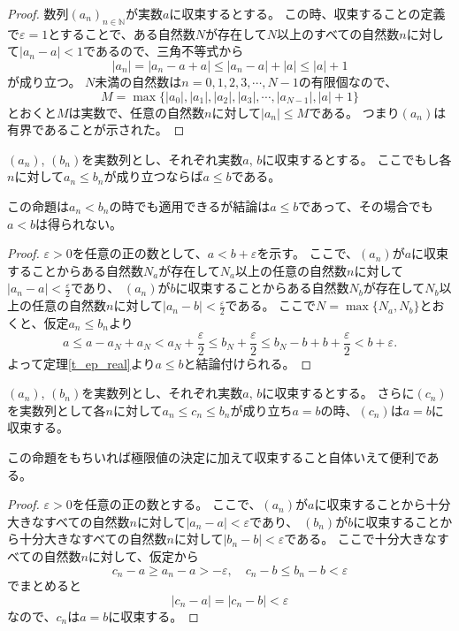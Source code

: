 \begin{proof}
数列$(a_n)_{n \in \mathbb{N}}$が実数$a$に収束するとする。
この時、収束することの定義で$\varepsilon = 1$とすることで、ある自然数$N$が存在して$N$以上のすべての自然数$n$に対して$|a_n-a| < 1$であるので、三角不等式から
$$
|a_n| = |a_n-a+a| \le |a_n-a|+|a| \le |a|+1
$$
が成り立つ。
$N$未満の自然数は$n = 0, 1, 2, 3, \cdots, N-1$の有限個なので、
$$
M = \max\{ |a_0|, |a_1|, |a_2|, |a_3|, \cdots, |a_{N-1}|, |a|+1 \}
$$
とおくと$M$は実数で、任意の自然数$n$に対して$|a_n| \le M$である。
つまり$(a_n)$は有界であることが示された。
\end{proof}

\begin{proposition}[極限と大小関係]
\label{t_limord}
$(a_n)$, $(b_n)$を実数列とし、それぞれ実数$a$, $b$に収束するとする。
ここでもし各$n$に対して$a_n \le b_n$が成り立つならば$a \le b$である。
\end{proposition}

\begin{remark}
この命題は$a_n < b_n$の時でも適用できるが結論は$a \le b$であって、その場合でも$a < b$は得られない。
\end{remark}

\begin{proof}
$\varepsilon > 0$を任意の正の数として、$a < b+\varepsilon$を示す。
ここで、$(a_n)$が$a$に収束することからある自然数$N_a$が存在して$N_a$以上の任意の自然数$n$に対して$|a_n-a| < \frac{\varepsilon}{2}$であり、
$(a_n)$が$b$に収束することからある自然数$N_b$が存在して$N_b$以上の任意の自然数$n$に対して$|a_n-b| < \frac{\varepsilon}{2}$である。
ここで$N = \max\{ N_a, N_b \}$とおくと、仮定$a_n \le b_n$より
$$
a \le a-a_N+a_N < a_N+\frac{\varepsilon}{2} \le b_N+\frac{\varepsilon}{2} \le b_N-b+b+\frac{\varepsilon}{2} < b+\varepsilon.
$$
よって定理\ref{t_ep_real}より$a \le b$と結論付けられる。
\end{proof}

\begin{proposition}[はさみうちの原理]
\label{t_squeeze}
$(a_n)$, $(b_n)$を実数列とし、それぞれ実数$a$, $b$に収束するとする。
さらに$(c_n)$を実数列として各$n$に対して$a_n \le c_n \le b_n$が成り立ち$a = b$の時、$(c_n)$は$a = b$に収束する。
\end{proposition}

この命題をもちいれば極限値の決定に加えて収束すること自体いえて便利である。

\begin{proof}
$\varepsilon > 0$を任意の正の数とする。
ここで、$(a_n)$が$a$に収束することから十分大きなすべての自然数$n$に対して$|a_n-a| < \varepsilon$であり、
$(b_n)$が$b$に収束することから十分大きなすべての自然数$n$に対して$|b_n-b| < \varepsilon$である。
ここで十分大きなすべての自然数$n$に対して、仮定から
$$
c_n-a \ge a_n-a > -\varepsilon, \quad c_n-b \le b_n-b < \varepsilon
$$
でまとめると
$$
|c_n-a| = |c_n-b| < \varepsilon
$$
なので、$c_n$は$a = b$に収束する。
\end{proof}

